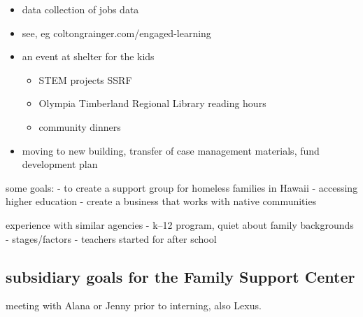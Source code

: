 \begin{itemize}
\tightlist
\item
  data collection of jobs data
\item
  see, eg coltongrainger.com/engaged-learning
\item
  an event at shelter for the kids

  \begin{itemize}
  \tightlist
  \item
    STEM projects SSRF
  \item
    Olympia Timberland Regional Library reading hours
  \item
    community dinners
  \end{itemize}
\item
  moving to new building, transfer of case management materials, fund
  development plan
\end{itemize}

some goals: - to create a support group for homeless families in Hawaii
- accessing higher education - create a business that works with native
communities

experience with similar agencies - k--12 program, quiet about family
backgrounds - stages/factors - teachers started for after school

\subsection{subsidiary goals for the Family Support
Center}\label{subsidiary-goals-for-the-family-support-center}

meeting with Alana or Jenny prior to interning, also Lexus.
